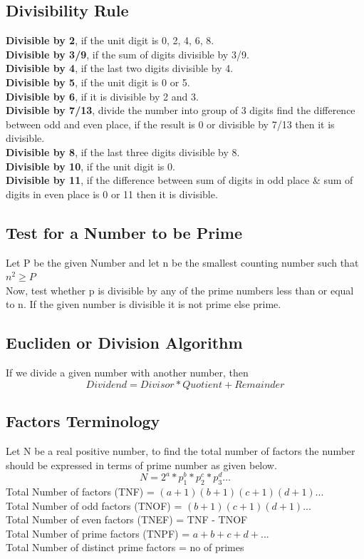 \subsection{Divisibility Rule}
\textbf{Divisible by 2}, if the unit digit is 0, 2, 4, 6, 8.\\
\textbf{Divisible by 3/9}, if the sum of digits divisible by 3/9.\\
\textbf{Divisible by 4}, if the last two digits divisible by 4.\\
\textbf{Divisible by 5}, if the unit digit is 0 or 5.\\
\textbf{Divisible by 6}, if it is divisible by 2 and 3.\\
\textbf{Divisible by 7/13}, divide the number into group of 3 digits find the difference between odd and even place, if the result is 0 or divisible by 7/13 then it is divisible.\\
\textbf{Divisible by 8}, if the last three digits divisible by 8.\\
\textbf{Divisible by 10}, if the unit digit is 0.\\
\textbf{Divisible by 11}, if the difference between sum of digits in odd place \& sum of digits in even place is 0 or 11 then it is divisible.


\subsection{Test for a Number to be Prime}
Let P be the given Number and let n be the smallest counting number such that \(n^2 \geq P\)\\
Now, test whether p is divisible by any of the prime numbers less than or equal to n. If the given number is divisible it is not prime else prime.


\subsection{Eucliden or Division Algorithm}
If we divide a given number with another number, then
\[Dividend = Divisor * Quotient + Remainder\]


\subsection{Factors Terminology}
Let N be a real positive number, to find the total number of factors the number should be expressed in terms of prime number as given below.
\[N = 2^a * p_1^b * p_2^c * p_3^d \ldots\]
Total Number of factors (TNF) = \((a+1)(b+1)(c+1)(d+1)...\)\\
Total Number of odd factors (TNOF) = \((b+1)(c+1)(d+1)...\)\\
Total Number of even factors (TNEF) = TNF - TNOF\\
Total Number of prime factors (TNPF) = \(a+b+c+d+...\)\\
Total Number of distinct prime factors = no of primes

